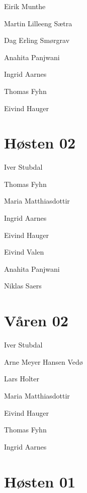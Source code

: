\begin{description}
	\item Eirik Munthe
	\item Martin Lilleeng Sætra
	\item Dag Erling Smørgrav
	\item Anahita Panjwani
	\item Ingrid Aarnes
	\item Thomas Fyhn
	\item Eivind Hauger
\end{description}

\section*{Høsten 02}

\begin{description}
	\item[Leder] Iver Stubdal
	\item[Nestleder] Thomas Fyhn
	\item[Funkansvarlig] Maria Matthiasdottir
	\item Ingrid Aarnes
	\item[Bedriftsansvarlig] Eivind Hauger
	\item Eivind Valen
	\item Anahita Panjwani
	\item Niklas Saers
\end{description}

\section*{Våren 02}

\begin{description}
	\item[Leder] Iver Stubdal
	\item[Nestleder] Arne Meyer Hansen Vedø
	\item[Økonomiansvarlig] Lars Holter
	\item[Funkansvarlig] Maria Matthiasdottir
	\item[Bedriftsansvarlig] Eivind Hauger
	\item Thomas Fyhn
	\item Ingrid Aarnes
\end{description}

\section*{Høsten 01}

